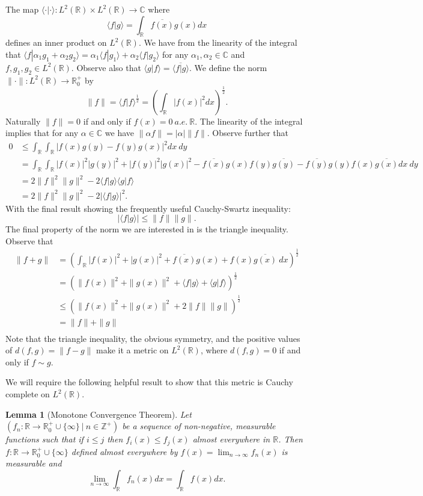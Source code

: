 \documentclass{report}
\newtheorem{thm:monoToneConv}[thm:ellwave]{Lemma}
\newcommand{\Z}{\mathbb{Z}}
\newcommand{\R}{\mathbb{R}}
\newcommand{\C}{\mathbb{C}}
\begin{document}
The map $\langle \cdot | \cdot \rangle: L^2 (\R ) \times L^2 (\R ) \to \C$ where
$$
\langle f | g \rangle = \int_\R \overline{f(x)}g(x) dx
$$
defines an inner product on $L^2 (\R )$. We have from the linearity of the integral that $\langle f | \alpha_1 g_1 + \alpha_2 g_2  \rangle=\alpha_1 \langle f | g_1 \rangle + \alpha_2 \langle f | g_2  \rangle$ for any $\alpha_1, \alpha_2 \in \C$ and $f,g_1,g_2 \in L^2 (\R )$. Observe also that $\langle g| f \rangle=\overline{\langle f | g \rangle}$. We define the norm $\| \cdot \| : L^2 (\R ) \to \R^+_0$ by
$$\| f\|=\langle f| f \rangle^{\frac 1 2}=\left ( \int_\R |f(x)|^2 dx \right )^\frac 1 2.$$
Naturally $\|f\|=0$ if and only if $f(x)=0 \ a.e. \ \R$. The linearity of the integral implies that for any $\alpha \in \C$ we have $\| \alpha f \|=|\alpha| \|f\|$. Observe further that
\begin{align*}
0 &\leq \int_\R \int_\R |f(x)g(y)-f(y)g(x)|^2 dx \ dy\\
& = \int_\R \int_\R |f(x)|^2|g(y)|^2+|f(y)|^2|g(x)|^2  - \overline{f(x)}g(x)f(y)\overline{g(y)}- \overline{f(y)}g(y)f(x)\overline{g(x)} dx \ dy\\
& = 2\|f\|^2 \|g\|^2 - 2\langle f | g \rangle \langle g | f \rangle \\
& = 2\|f\|^2 \|g\|^2 - 2|\langle f | g \rangle|^2.
\end{align*}
With the final result showing the frequently useful Cauchy-Swartz inequality:
$$
|\langle f | g \rangle| \leq \|f\| \|g\|.
$$
The final property of the norm we are interested in is the triangle inequality. Observe that
\begin{align*}
\| f+g \| &= \left ( \int_\R |f(x)|^2 + |g(x)|^2 + \overline{f(x)}g(x)+f(x)\overline{g(x)} \ dx \right )^\frac 1 2\\
&= \left ( \|f(x)\|^2 + \|g(x)\|^2 + \langle f | g \rangle+ \langle g | f \rangle \right )^\frac 1 2 \\
&\leq \left ( \|f(x)\|^2 + \|g(x)\|^2 + 2\|f\| \|g\| \right)^\frac 1 2 \\
&=\|f\| +\|g\| \\
\end{align*}
Note that the triangle inequality, the obvious symmetry, and the positive values of $d(f,g)=\|f-g\|$ make it a metric on $L^2 (\R )$, where $d(f,g)=0$ if and only if $f\sim g$. 

We will require the following helpful result to show that this metric is Cauchy complete on $L^2 (\R )$.
\begin{thm:monoToneConv}[Monotone Convergence Theorem]
Let $( f_n: \R \to \R^+_0 \cup \{ \infty\}  \ | \ n \in \Z^+ )$ be a sequence of non-negative, measurable functions such that if $i \leq j$ then $f_i(x) \leq f_j(x)$ almost everywhere in $\R$.
 Then $f : \R \to \R^+_0\cup \{\infty\} $ defined almost everywhere by  $f(x)=\lim_{n \to \infty} f_n(x)$ is measurable and
 $$
\lim_{n \to \infty} \int_\R f_n(x) dx = \int_\R f(x) dx.
$$
\end{thm:monoToneConv}
\end{document}

